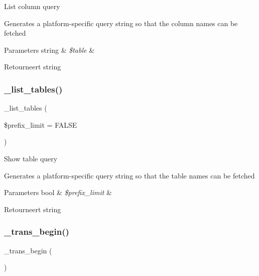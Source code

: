 List column query

Generates a platform-\/specific query string so that the column names can be fetched


\begin{DoxyParams}[1]{Parameters}
string & {\em \$table} & \\
\hline
\end{DoxyParams}
\begin{DoxyReturn}{Retourneert}
string 
\end{DoxyReturn}
\mbox{\label{class_c_i___d_b__postgre__driver_a435c0f3ce54fe7daa178baa8532ebd54}} 
\subsubsection{\texorpdfstring{\_list\_tables()}{\_list\_tables()}}
{\footnotesize\ttfamily \+\_\+list\+\_\+tables (\begin{DoxyParamCaption}\item[{}]{\$prefix\+\_\+limit = {\ttfamily FALSE} }\end{DoxyParamCaption})\hspace{0.3cm}{\ttfamily [protected]}}

Show table query

Generates a platform-\/specific query string so that the table names can be fetched


\begin{DoxyParams}[1]{Parameters}
bool & {\em \$prefix\+\_\+limit} & \\
\hline
\end{DoxyParams}
\begin{DoxyReturn}{Retourneert}
string 
\end{DoxyReturn}
\mbox{\label{class_c_i___d_b__postgre__driver_ac81ac882c1d54347d810199a15856aac}} 
\subsubsection{\texorpdfstring{\_trans\_begin()}{\_trans\_begin()}}
{\footnotesize\ttfamily \+\_\+trans\+\_\+begin (\begin{DoxyParamCaption}{ }\end{DoxyParamCaption})\hspace{0.3cm}{\ttfamily [protected]}}

